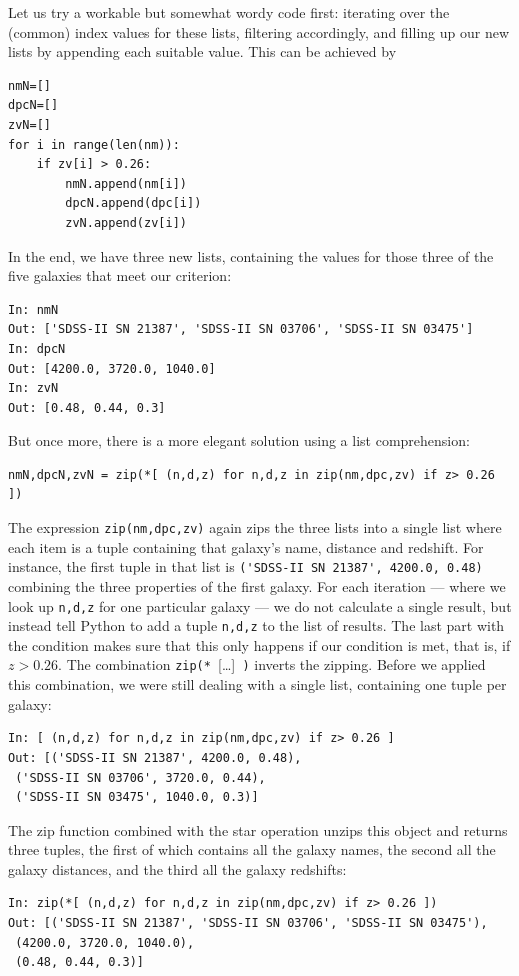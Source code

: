 \documentclass[twocolumn,apj]{openjournal}
\begin{document}
Let us try a workable but somewhat wordy code first: iterating over the (common) index values for these lists, filtering accordingly, and filling up our new lists by appending each suitable value. This can be achieved by
\begin{lstlisting}
nmN=[]
dpcN=[]
zvN=[]
for i in range(len(nm)):
	if zv[i] > 0.26:
		nmN.append(nm[i])
		dpcN.append(dpc[i])
		zvN.append(zv[i])
\end{lstlisting}
In the end, we have three new lists, containing the values for those three of the five galaxies that meet our criterion:
\begin{lstlisting}
In: nmN
Out: ['SDSS-II SN 21387', 'SDSS-II SN 03706', 'SDSS-II SN 03475']
In: dpcN
Out: [4200.0, 3720.0, 1040.0]
In: zvN
Out: [0.48, 0.44, 0.3]
\end{lstlisting}
But once more, there is a more elegant solution using a list comprehension:
\begin{lstlisting}
nmN,dpcN,zvN = zip(*[ (n,d,z) for n,d,z in zip(nm,dpc,zv) if z> 0.26 ])
\end{lstlisting}
The expression \verb|zip(nm,dpc,zv)| again zips the three lists into a single list where each item is a tuple containing that galaxy's name, distance and redshift. For instance, the first tuple in that list is \verb|('SDSS-II SN 21387', 4200.0, 0.48)| combining the three properties of the first galaxy. For each iteration --- where we look up \verb|n,d,z| for one particular galaxy --- we do not calculate a single result, but instead tell Python to add a tuple \verb|n,d,z| to the list of results. The last part with the condition makes sure that this only happens  if our condition is met, that is, if $z>0.26$. The combination \verb|zip(* |[\dots]\verb| )| inverts the zipping. Before we applied  this combination, we were still dealing with a single list, containing one tuple per galaxy:
\begin{lstlisting}
In: [ (n,d,z) for n,d,z in zip(nm,dpc,zv) if z> 0.26 ]
Out: [('SDSS-II SN 21387', 4200.0, 0.48),
 ('SDSS-II SN 03706', 3720.0, 0.44),
 ('SDSS-II SN 03475', 1040.0, 0.3)]
\end{lstlisting}
The zip function combined with the star operation unzips this object and returns three tuples, the first of which contains all the galaxy names, the second all the galaxy distances, and the third all the galaxy redshifts:
\begin{lstlisting}
In: zip(*[ (n,d,z) for n,d,z in zip(nm,dpc,zv) if z> 0.26 ])
Out: [('SDSS-II SN 21387', 'SDSS-II SN 03706', 'SDSS-II SN 03475'),
 (4200.0, 3720.0, 1040.0),
 (0.48, 0.44, 0.3)]
 \end{lstlisting}
\end{document}
